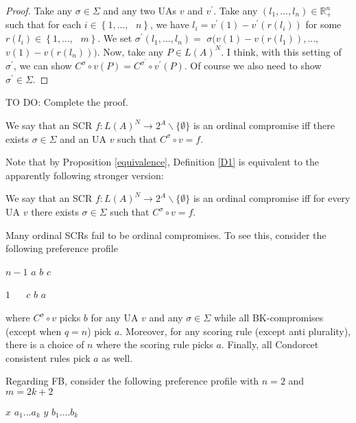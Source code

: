 \documentclass[version=3.21, pagesize, notitlepage, twoside=off, bibliography=totoc, DIV=calc, fontsize=12pt, a4paper]{scrartcl}
\begin{document}
\begin{proof}
Take any $\sigma \in \Sigma $ and any two UAs $v$ and $v^{\prime }$. Take
any $(l_{1},...,l_{n})\in 
\mathbb{R}
_{+}^{n}$ such that for each $i\in \left\{ 1,...,\text{ }n\right\} $, we
have $l_{i}=v^{\prime }(1)-v^{\prime }(r(l_{i}))$ for some $r(l_{i})\in
\left\{ 1,...,\text{ }m\right\} $. We set $\sigma ^{\prime
}(l_{1},...,l_{n})=$ $\sigma (v(1)-v(r(l_{1})),...,$ $v(1)-v(r(l_{n}))).$
Now, take any $P\in L(A)^{N}$. I think, with this setting of $\sigma
^{\prime }$, we can show $C^{\sigma }\circ v(P)=C^{\sigma ^{\prime }}\circ
v^{\prime }(P).$ Of course we also need to show $\sigma ^{\prime }\in \Sigma 
$.
\end{proof}

TO DO: Complete the proof.

\begin{definition}
\label{D1} \bigskip We say that an SCR $f:L(A)^{N}\rightarrow
2^{A}\backslash \{\emptyset \}$ is an ordinal compromise iff there exists $%
\sigma \in \Sigma $ and an UA $v$ such that $C^{\sigma }\circ v=f$.
\end{definition}

Note that by Proposition \ref{equivalence}, Definition \ref{D1} is
equivalent to the apparently following stronger version:

\begin{definition}
\label{D2} We say that an SCR $f:L(A)^{N}\rightarrow 2^{A}\backslash
\{\emptyset \}$ is an ordinal compromise iff for every UA $v$ there exists $%
\sigma \in \Sigma $ such that $C^{\sigma }\circ v=f$.
\end{definition}

Many ordinal SCRs fail to be ordinal compromises. To see this, consider the
following preference profile

$n-1$ $a$ $b$ $c$

$1$ $\ \ \ \ \ \ c$ $b$ $a$

where $C^{\sigma }\circ v$ picks $b$ for any UA $v$ and any $\sigma \in
\Sigma $ while all BK-compromises (except when $q=n$) pick $a$. Moreover,
for any scoring rule (except anti plurality), there is a choice of $n$ where
the scoring rule picks $a$. Finally, all Condorcet consistent rules pick $a$
as well.

Regarding FB, consider the following preference profile with $n=2$ and $%
m=2k+2$

\bigskip

$x$ $a_{1}...a_{k}$ $y$ $b_{1}....b_{k}$
\end{document}
